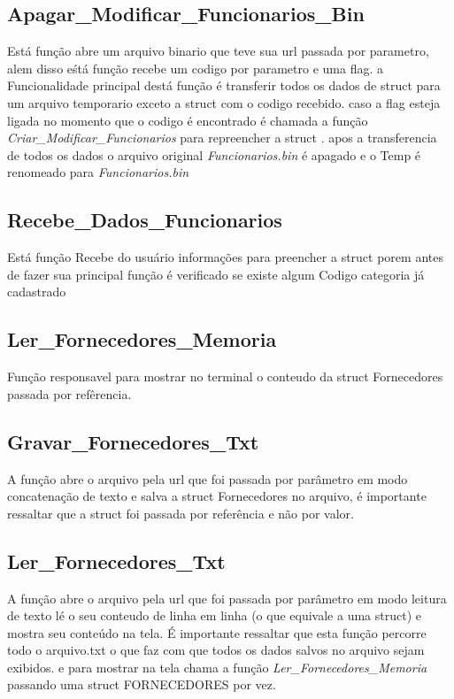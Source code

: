 \documentclass{article}
\begin{document}
\subsection{Apagar\_Modificar\_Funcionarios\_Bin}
	Está função abre um arquivo binario que teve sua  url passada por parametro, alem disso eśtá função recebe um codigo por parametro e uma flag.
	a Funcionalidade principal destá função é transferir todos os dados de struct para um arquivo temporario exceto a struct com o codigo recebido. caso a flag esteja ligada no momento que o codigo é encontrado é chamada a função \textit{Criar\_Modificar\_Funcionarios} para repreencher a struct . apos a transferencia de todos os dados o arquivo original \textit{Funcionarios.bin} é apagado e o Temp é renomeado para \textit{Funcionarios.bin}

\subsection{Recebe\_Dados\_Funcionarios}	
	Está função Recebe do usuário informações para preencher a struct porem antes de fazer sua principal função é verificado se existe algum Codigo categoria já cadastrado
	

\subsection{Ler\_Fornecedores\_Memoria}
	Função responsavel para mostrar no terminal o conteudo da struct Fornecedores passada por  refêrencia.

\subsection{Gravar\_Fornecedores\_Txt}
	A função abre o arquivo pela url que foi passada por parâmetro em modo concatenação de texto e salva a struct Fornecedores  no arquivo, é importante ressaltar que  a struct foi passada por referência e não por valor.

\subsection{Ler\_Fornecedores\_Txt}
	A função abre o arquivo pela url que foi passada por parâmetro em modo leitura de texto lé o seu conteudo de linha em linha (o que equivale a uma struct) e mostra seu conteúdo na tela. É importante ressaltar que esta função percorre todo o arquivo.txt o que faz com que todos os dados salvos no arquivo sejam exibidos. e para mostrar na tela chama a função \textit{Ler\_Fornecedores\_Memoria} passando uma struct FORNECEDORES  por vez.
\end{document}
